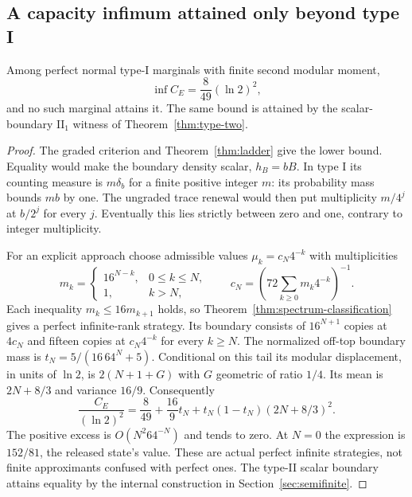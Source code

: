 \subsection{A capacity infimum attained only beyond type I}\label{sec:capacity-infimum}
\begin{theorem}\label{thm:capacity-infimum}
Among perfect normal type-I marginals with finite second modular moment,
\[
 \inf C_E=\frac8{49}(\ln2)^2,
\]
and no such marginal attains it. The same bound is attained by the scalar-boundary $\mathrm{II}_1$ witness of Theorem~\ref{thm:type-two}.
\end{theorem}
\begin{proof}
The graded criterion and Theorem~\ref{thm:ladder} give the lower bound. Equality would make the boundary density scalar, $h_B=bB$. In type I its counting measure is $m\delta_b$ for a finite positive integer $m$: its probability mass bounds $mb$ by one. The ungraded trace renewal would then put multiplicity $m/4^j$ at $b/2^j$ for every $j$. Eventually this lies strictly between zero and one, contrary to integer multiplicity.

For an explicit approach choose admissible values $\mu_k=c_N4^{-k}$ with multiplicities
\[
 m_k=\begin{cases}16^{N-k},&0\le k\le N,\\1,&k>N,\end{cases}
 \qquad c_N=\left(72\sum_{k\ge0}m_k4^{-k}\right)^{-1}.
\]
Each inequality $m_k\le16m_{k+1}$ holds, so Theorem~\ref{thm:spectrum-classification} gives a perfect infinite-rank strategy. Its boundary consists of $16^{N+1}$ copies at $4c_N$ and fifteen copies at $c_N4^{-k}$ for every $k\ge N$. The normalized off-top boundary mass is $t_N=5/(16\,64^N+5)$. Conditional on this tail its modular displacement, in units of $\ln2$, is $2(N+1+G)$ with $G$ geometric of ratio $1/4$. Its mean is $2N+8/3$ and variance $16/9$. Consequently
\begin{equation}\label{eq:capacity-approach}
 \frac{C_E}{(\ln2)^2}=\frac8{49}+\frac{16}{9}t_N+
                    t_N(1-t_N)(2N+8/3)^2.
\end{equation}
The positive excess is $O(N^2 64^{-N})$ and tends to zero. At $N=0$ the expression is $152/81$, the released state's value. These are actual perfect infinite strategies, not finite approximants confused with perfect ones. The type-II scalar boundary attains equality by the internal construction in Section~\ref{sec:semifinite}.
\end{proof}
